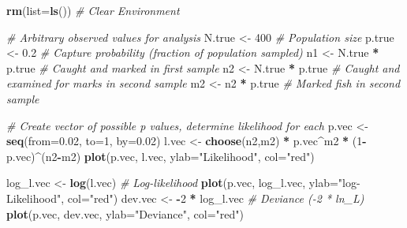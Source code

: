 \documentclass[
]{krantz}
\makeatletter
\newenvironment{Shaded}{\begin{snugshade}}{\end{snugshade}}
\newcommand{\AttributeTok}[1]{\textcolor[rgb]{0.27,0.27,0.27}{#1}}
\newcommand{\CommentTok}[1]{\textcolor[rgb]{0.37,0.37,0.37}{\textit{#1}}}
\newcommand{\DecValTok}[1]{\textcolor[rgb]{0.06,0.06,0.06}{#1}}
\newcommand{\FloatTok}[1]{\textcolor[rgb]{0.06,0.06,0.06}{#1}}
\newcommand{\FunctionTok}[1]{\textcolor[rgb]{0.27,0.27,0.27}{\textbf{#1}}}
\newcommand{\NormalTok}[1]{#1}
\newcommand{\OtherTok}[1]{\textcolor[rgb]{0.37,0.37,0.37}{#1}}
\newcommand{\SpecialCharTok}[1]{\textcolor[rgb]{0.43,0.43,0.43}{\textbf{#1}}}
\newcommand{\StringTok}[1]{\textcolor[rgb]{0.5,0.5,0.5}{#1}}
\newenvironment{kframe}{%
\medskip{}
\setlength{\fboxsep}{.8em}
 \def\at@end@of@kframe{}%
 \ifinner\ifhmode%
  \def\at@end@of@kframe{\end{minipage}}%
  \begin{minipage}{\columnwidth}%
 \fi\fi%
 \def\FrameCommand##1{\hskip\@totalleftmargin \hskip-\fboxsep
 \colorbox{shadecolor}{##1}\hskip-\fboxsep
     \hskip-\linewidth \hskip-\@totalleftmargin \hskip\columnwidth}%
 \MakeFramed {\advance\hsize-\width
   \@totalleftmargin\z@ \linewidth\hsize
   \@setminipage}}%
 {\par\unskip\endMakeFramed%
 \at@end@of@kframe}
\renewenvironment{Shaded}{\begin{kframe}}{\end{kframe}}
\makeatother
\begin{document}
\begin{Shaded}
\begin{Highlighting}[]
\FunctionTok{rm}\NormalTok{(}\AttributeTok{list=}\FunctionTok{ls}\NormalTok{()) }\CommentTok{\# Clear Environment}

\CommentTok{\# Arbitrary \textquotesingle{}observed\textquotesingle{} values for analysis}
\NormalTok{N.true }\OtherTok{\textless{}{-}} \DecValTok{400}  \CommentTok{\# Population size}
\NormalTok{p.true }\OtherTok{\textless{}{-}} \FloatTok{0.2} \CommentTok{\# Capture probability (fraction of population sampled)}
\NormalTok{n1 }\OtherTok{\textless{}{-}}\NormalTok{ N.true }\SpecialCharTok{*}\NormalTok{ p.true }\CommentTok{\# Caught and marked in first sample}
\NormalTok{n2 }\OtherTok{\textless{}{-}}\NormalTok{ N.true }\SpecialCharTok{*}\NormalTok{ p.true }\CommentTok{\# Caught and examined for marks in second sample}
\NormalTok{m2 }\OtherTok{\textless{}{-}}\NormalTok{ n2 }\SpecialCharTok{*}\NormalTok{ p.true }\CommentTok{\# Marked fish in second sample}

\CommentTok{\# Create vector of possible p values, determine likelihood for each}
\NormalTok{p.vec }\OtherTok{\textless{}{-}} \FunctionTok{seq}\NormalTok{(}\AttributeTok{from=}\FloatTok{0.02}\NormalTok{, }\AttributeTok{to=}\DecValTok{1}\NormalTok{, }\AttributeTok{by=}\FloatTok{0.02}\NormalTok{)}
\NormalTok{l.vec }\OtherTok{\textless{}{-}} \FunctionTok{choose}\NormalTok{(n2,m2) }\SpecialCharTok{*}\NormalTok{ p.vec}\SpecialCharTok{\^{}}\NormalTok{m2 }\SpecialCharTok{*}\NormalTok{ (}\DecValTok{1}\SpecialCharTok{{-}}\NormalTok{p.vec)}\SpecialCharTok{\^{}}\NormalTok{(n2}\SpecialCharTok{{-}}\NormalTok{m2)}
\FunctionTok{plot}\NormalTok{(p.vec, l.vec, }\AttributeTok{ylab=}\StringTok{"Likelihood"}\NormalTok{, }\AttributeTok{col=}\StringTok{"red"}\NormalTok{)}

\NormalTok{log\_l.vec }\OtherTok{\textless{}{-}} \FunctionTok{log}\NormalTok{(l.vec) }\CommentTok{\# Log{-}likelihood}
\FunctionTok{plot}\NormalTok{(p.vec, log\_l.vec, }\AttributeTok{ylab=}\StringTok{"log{-}Likelihood"}\NormalTok{, }\AttributeTok{col=}\StringTok{"red"}\NormalTok{)}
\NormalTok{dev.vec }\OtherTok{\textless{}{-}} \SpecialCharTok{{-}}\DecValTok{2} \SpecialCharTok{*}\NormalTok{ log\_l.vec }\CommentTok{\# Deviance ({-}2 * ln\_L)}
\FunctionTok{plot}\NormalTok{(p.vec, dev.vec, }\AttributeTok{ylab=}\StringTok{"Deviance"}\NormalTok{, }\AttributeTok{col=}\StringTok{"red"}\NormalTok{)}
\end{Highlighting}
\end{Shaded}
\end{document}

